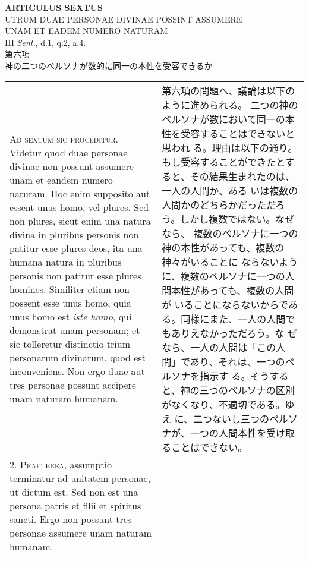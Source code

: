 \documentclass[10pt]{jsarticle} %
\begin{document}
\newpage



\begin{center}
 {\Large {\bf ARTICULUS SEXTUS}}\\
 {\large UTRUM DUAE PERSONAE DIVINAE POSSINT ASSUMERE\\UNAM ET EADEM
 NUMERO NATURAM}\\
 {\footnotesize III {\itshape Sent.}, d.1, q.2, a.4.}\\
 {\Large 第六項\\神の二つのペルソナが数的に同一の本性を受容できるか}
\end{center}

\begin{longtable}{p{21em}p{21em}}




{\Huge A}{\scshape d sextum sic proceditur}. Videtur quod duae personae divinae non possunt
assumere unam et eandem numero naturam. Hoc enim supposito aut essent
unus homo, vel plures. Sed non plures, sicut enim una natura divina in
pluribus personis non patitur esse plures deos, ita una humana natura in
pluribus personis non patitur esse plures homines. Similiter etiam non
 possent esse unus homo, quia unus homo est {\itshape iste homo}, qui demonstrat
unam personam; et sic tolleretur distinctio trium personarum divinarum,
quod est inconveniens. Non ergo duae aut tres personae possunt accipere
unam naturam humanam.


&


第六項の問題へ、議論は以下のように進められる。
二つの神のペルソナが数において同一の本性を受容することはできないと思われ
 る。理由は以下の通り。
もし受容することができたとすると、その結果生まれたのは、一人の人間か、ある
 いは複数の人間かのどちらかだっただろう。しかし複数ではない。なぜなら、
 複数のペルソナに一つの神の本性があっても、複数の神々がいることに
 ならないように、複数のペルソナに一つの人間本性があっても、複数の人間が
 いることにならないからである。同様にまた、一人の人間でもありえなかっただろう。な
 ぜなら、一人の人間は「この人間」であり、それは、一つのペルソナを指示す
 る。そうすると、神の三つのペルソナの区別がなくなり、不適切である。ゆえ
 に、二つないし三つのペルソナが、一つの人間本性を受け取ることはできない。

\\



2. {\scshape Praeterea}, assumptio terminatur ad unitatem personae, ut dictum est. Sed
non est una persona patris et filii et spiritus sancti. Ergo non possunt
tres personae assumere unam naturam humanam.



\end{longtable}
\end{document}
